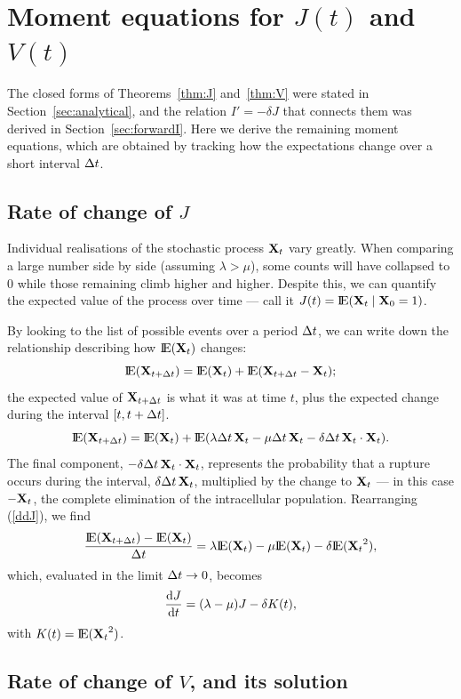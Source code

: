 \section{Moment equations for $J(t)$ and $V(t)$}
\label{sec:moments}

The closed forms of Theorems~\ref{thm:J} and~\ref{thm:V} were stated in
Section~\ref{sec:analytical}, and the relation $I'=-\delta J$ that connects
them was derived in Section~\ref{sec:forwardI}. Here we derive the remaining
moment equations, which are obtained by tracking how the expectations change
over a short interval $\Delta t$.

\subsection{Rate of change of $J$}

Individual realisations of the stochastic process ${{\bf X}_t}$ vary greatly. When
comparing a large number side by side (assuming $\lambda > \mu$), some counts
will have collapsed to $0$ while those remaining climb higher and higher.
Despite this, we can quantify the expected value of the process over time ---
call it $J(t) = {\rm I}\!{\rm E}({{\bf X}_t}\;|\;{\bf X}_0=1)$.

By looking to the list of possible events over a period $\Delta t$, we can write
down the relationship describing how ${\rm I}\!{\rm E}({{\bf X}_t})$ changes:
$${\rm I}\!{\rm E}({\bf X}_{t+\Delta t}) = {\rm I}\!{\rm E}({{\bf X}_t}) + {\rm I}\!{\rm E}({\bf X}_{t+\Delta t}-{{\bf X}_t});$$
the expected value of ${\bf X}_{t+\Delta t}$ is what it was at time $t$, plus the
expected change during the interval $[t, t+\Delta t]$.
\begin{equation}
\label{ddJ}
{\rm I}\!{\rm E}({\bf X}_{t+\Delta t}) = {\rm I}\!{\rm E}({{\bf X}_t}) + {\rm I}\!{\rm E}(\lambda\Delta t\,{{\bf X}_t} - \mu\Delta t\,{{\bf X}_t} - \delta\Delta t\,{{\bf X}_t}\cdot{{\bf X}_t}).
\end{equation}
The final component, $-\delta\Delta t\,{{\bf X}_t}\cdot{{\bf X}_t}$, represents the probability
that a rupture occurs during the interval, $\delta\Delta t\,{{\bf X}_t}$, multiplied by
the change to ${{\bf X}_t}$ --- in this case $-{{\bf X}_t}$, the complete elimination of the
intracellular population. Rearranging (\ref{ddJ}), we find
$$\frac{{\rm I}\!{\rm E}({\bf X}_{t+\Delta t}) - {\rm I}\!{\rm E}({{\bf X}_t})}{\Delta t} = \lambda{\rm I}\!{\rm E}({{\bf X}_t}) - \mu{\rm I}\!{\rm E}({{\bf X}_t}) - \delta {\rm I}\!{\rm E}({{\bf X}_t}^2),$$
which, evaluated in the limit $\Delta t \to 0$, becomes
\begin{equation}
\label{ddJ2}
\displaystyle\frac{{\rm d} J}{{\rm d} t} = (\lambda - \mu) J - \delta K(t),
\end{equation}
with $K(t) = {\rm I}\!{\rm E}({{\bf X}_t}^2)$.

\subsection{Rate of change of $V$, and its solution}


